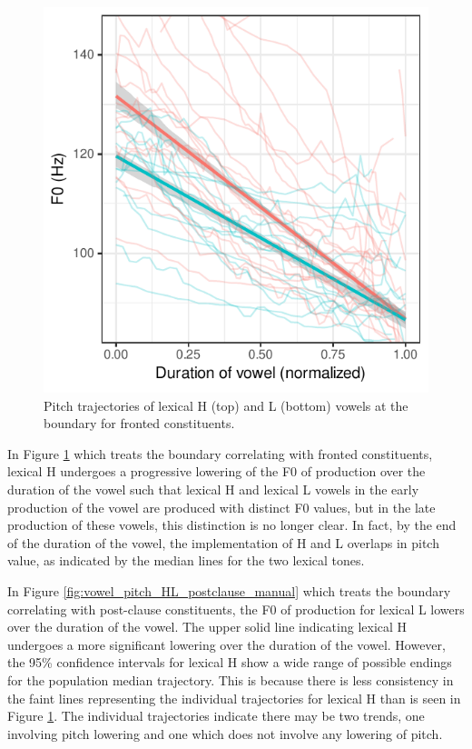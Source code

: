 \documentclass[
  11pt,
  b5paper,
]{article}
\begin{document}
\begin{figure}
\centering
\includegraphics{figure/vowel-pitch-HL-fronted-manual-1.pdf}
\caption{Pitch trajectories of lexical H (top) and L (bottom) vowels at
the boundary for fronted
constituents.\label{fig:vowel_pitch_HL_fronted_manual}}
\end{figure}

In Figure \ref{fig:vowel_pitch_HL_fronted_manual} which treats the
boundary correlating with fronted constituents, lexical H undergoes a
progressive lowering of the F0 of production over the duration of the
vowel such that lexical H and lexical L vowels in the early production
of the vowel are produced with distinct F0 values, but in the late
production of these vowels, this distinction is no longer clear. In
fact, by the end of the duration of the vowel, the implementation of H
and L overlaps in pitch value, as indicated by the median lines for the
two lexical tones.

In Figure \ref{fig:vowel_pitch_HL_postclause_manual} which treats the
boundary correlating with post-clause constituents, the F0 of production
for lexical L lowers over the duration of the vowel. The upper solid
line indicating lexical H undergoes a more significant lowering over the
duration of the vowel. However, the 95\% confidence intervals for
lexical H show a wide range of possible endings for the population
median trajectory. This is because there is less consistency in the
faint lines representing the individual trajectories for lexical H than
is seen in Figure \ref{fig:vowel_pitch_HL_fronted_manual}. The
individual trajectories indicate there may be two trends, one involving
pitch lowering and one which does not involve any lowering of pitch.
\end{document}
